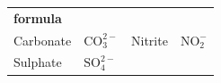 {\begin{center}
\begin{xtabular*}{\mytablewidth}[t]{|p{10\mystarwidth}|p{10\mystarwidth}|p{10\mystarwidth}|p{10\mystarwidth}|}
    
        \textbf{formula}%
     \tabularnewline{}
    
    
        Carbonate &
    
    
        \begin{math}\mathrm{CO}_{3}^{2-}\end{math} &
    
    
        Nitrite &
    
    
        \begin{math}\mathrm{NO}_{2}^{-}\end{math}%
     \tabularnewline{}
    
    
        Sulphate &
    
    
        \begin{math}\mathrm{SO}_{4}^{2-}\end{math} &
    

\end{xtabular*}
\end{center}}

